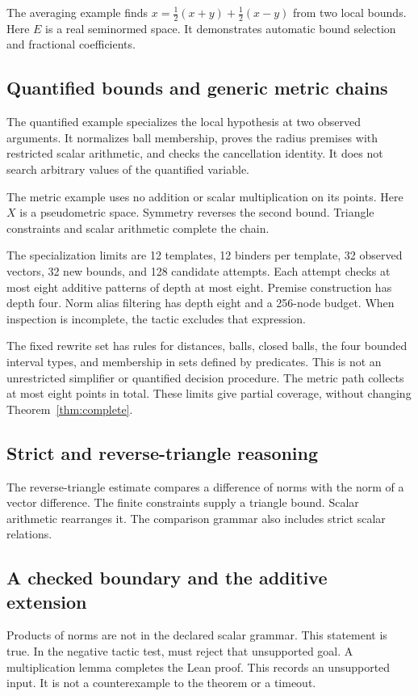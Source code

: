 The averaging example finds $x=\frac12(x+y)+\frac12(x-y)$ from two local bounds.
Here $E$ is a real seminormed space.
It demonstrates automatic bound selection and fractional coefficients.


\subsection{Quantified bounds and generic metric chains}
The quantified example specializes the local hypothesis at two observed arguments.
It normalizes ball membership, proves the radius premises with restricted scalar arithmetic, and checks the cancellation identity.
It does not search arbitrary values of the quantified variable.


The metric example uses no addition or scalar multiplication on its points.
Here $X$ is a pseudometric space.
Symmetry reverses the second bound.
Triangle constraints and scalar arithmetic complete the chain.


The specialization limits are 12 templates, 12 binders per template, 32 observed vectors, 32 new bounds, and 128 candidate attempts.
Each attempt checks at most eight additive patterns of depth at most eight.
Premise construction has depth four.
Norm alias filtering has depth eight and a 256-node budget.
When inspection is incomplete, the tactic excludes that expression.

The fixed rewrite set has rules for distances, balls, closed balls, the four bounded interval types, and membership in sets defined by predicates.
This is not an unrestricted simplifier or quantified decision procedure.
The metric path collects at most eight points in total.
These limits give partial coverage, without changing Theorem~\ref{thm:complete}.

\subsection{Strict and reverse-triangle reasoning}
The reverse-triangle estimate compares a difference of norms with the norm of a vector difference.
The finite constraints supply a triangle bound.
Scalar arithmetic rearranges it.
The comparison grammar also includes strict scalar relations.


\subsection{A checked boundary and the additive extension}
Products of norms are not in the declared scalar grammar.
This statement is true.
In the negative tactic test, \NA{} must reject that unsupported goal.
A multiplication lemma completes the Lean proof.
This records an unsupported input.
It is not a counterexample to the theorem or a timeout.


